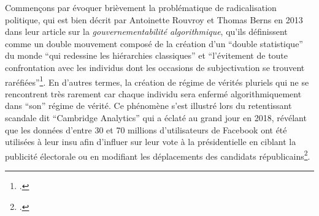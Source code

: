 Commençons par évoquer brièvement la problématique de radicalisation politique, qui est bien décrit par Antoinette Rouvroy et Thomas Berns en 2013 dans leur article sur la \textit{gouvernementabilité algorithmique}, qu’ils définissent comme un double mouvement composé de la création d’un \enquote{double statistique} du monde \enquote{qui redessine les hiérarchies classiques} et \enquote{l’évitement de toute confrontation avec les individus dont les occasions de subjectivation se trouvent raréfiées}\footcite{rouvroy_gouvernementalite_2013}. En d'autres termes, la création de régime de vérités pluriels qui ne se rencontrent très rarement car chaque individu sera enfermé algorithmiquement dans \enquote{son} régime de vérité. Ce phénomène s’est illustré lors du retentissant scandale dit \enquote{Cambridge Analytics} qui a éclaté au grand jour en 2018, révélant que les données d’entre 30 et 70 millions d’utilisateurs de Facebook ont été utilisées à leur insu afin d’influer sur leur vote à la présidentielle en ciblant la publicité électorale ou en modifiant les déplacements des candidats républicains\footcite{noauthor_ce_2018}.

